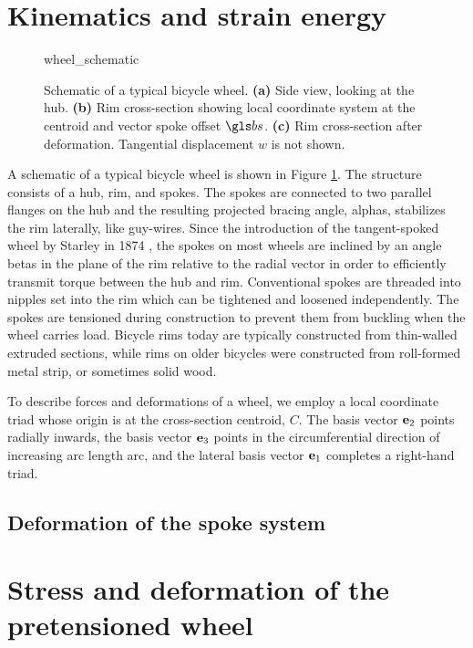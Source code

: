 \documentclass[\rootdir/thesis.tex]{subfiles}
\begin{document}
\section{Kinematics and strain energy}

\begin{figure}[b]
\centering
{wheel_schematic}
\caption{Schematic of a typical bicycle wheel. \textbf{(a)} Side view, looking at the hub. \textbf{(b)} Rim cross-section showing local coordinate system at the centroid and vector spoke offset $\bs$. \textbf{(c)} Rim cross-section after deformation. Tangential displacement $w$ is not shown.}
\label{fig:wheel_schematic}
\end{figure}

A schematic of a typical bicycle wheel is shown in Figure \ref{fig:wheel_schematic}. The structure consists of a hub, rim, and spokes. The spokes are connected to two parallel flanges on the hub and the resulting projected bracing angle, \gls{alphas}, stabilizes the rim laterally, like guy-wires. Since the introduction of the tangent-spoked wheel by Starley in 1874 \cite{Hadland2014}, the spokes on most wheels are inclined by an angle \gls{betas} in the plane of the rim relative to the radial vector in order to efficiently transmit torque between the hub and rim. Conventional spokes are threaded into nipples set into the rim which can be tightened and loosened independently. The spokes are tensioned during construction to prevent them from buckling when the wheel carries load. Bicycle rims today are typically constructed from thin-walled extruded sections, while rims on older bicycles were constructed from roll-formed metal strip, or sometimes solid wood.

To describe forces and deformations of a wheel, we employ a local coordinate triad whose origin is at the cross-section centroid, $C$. The basis vector $\mathbf{e}_2$ points radially inwards, the basis vector $\mathbf{e}_3$ points in the circumferential direction of increasing arc length \gls{arc}, and the lateral basis vector $\mathbf{e}_1$ completes a right-hand triad.



\subsection{Deformation of the spoke system}



\section{Stress and deformation of the pretensioned wheel}
\label{sec:radial_bulging}

\end{document}
